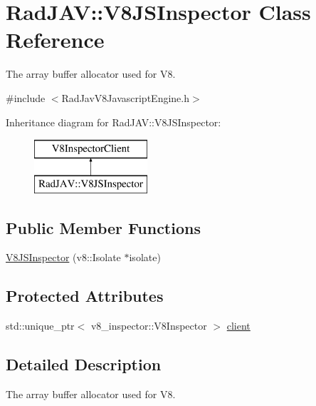 \hypertarget{class_rad_j_a_v_1_1_v8_j_s_inspector}{}\section{Rad\+J\+AV\+:\+:V8\+J\+S\+Inspector Class Reference}
\label{class_rad_j_a_v_1_1_v8_j_s_inspector}


The array buffer allocator used for V8.  




{\ttfamily \#include $<$Rad\+Jav\+V8\+Javascript\+Engine.\+h$>$}

Inheritance diagram for Rad\+J\+AV\+:\+:V8\+J\+S\+Inspector\+:\begin{figure}[H]
\begin{center}
\leavevmode
\includegraphics[height=2.000000cm]{class_rad_j_a_v_1_1_v8_j_s_inspector}
\end{center}
\end{figure}
\subsection*{Public Member Functions}
\begin{DoxyCompactItemize}
\item 
\mbox{\hyperlink{class_rad_j_a_v_1_1_v8_j_s_inspector_a47fc1dc7067a49100c48a760ed7e288d}{V8\+J\+S\+Inspector}} (v8\+::\+Isolate $\ast$isolate)
\end{DoxyCompactItemize}
\subsection*{Protected Attributes}
\begin{DoxyCompactItemize}
\item 
std\+::unique\+\_\+ptr$<$ v8\+\_\+inspector\+::\+V8\+Inspector $>$ \mbox{\hyperlink{class_rad_j_a_v_1_1_v8_j_s_inspector_aef379a913b0a7ffb9d66e59d91d8e5f5}{client}}
\end{DoxyCompactItemize}


\subsection{Detailed Description}
The array buffer allocator used for V8. 

